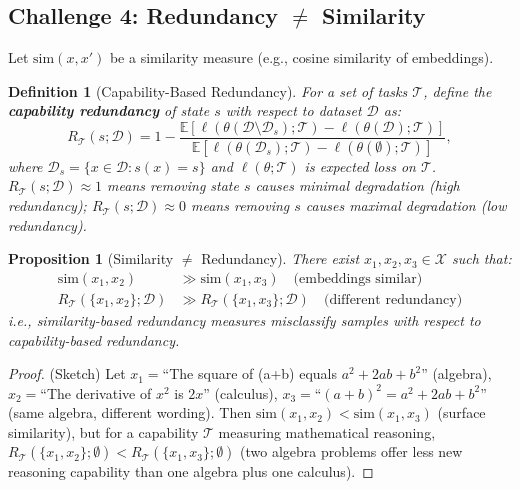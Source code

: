 \documentclass[11pt]{article}
\newtheorem{definition}{Definition}[section]
\newtheorem{proposition}{Proposition}[section]
\newcommand{\cX}{\mathcal{X}}
\newcommand{\cT}{\mathcal{T}}
\begin{document}
\subsection{Challenge 4: Redundancy $\neq$ Similarity}

Let $\text{sim}(x, x')$ be a similarity measure (e.g., cosine similarity of embeddings).

\begin{definition}[Capability-Based Redundancy]
For a set of tasks $\cT$, define the \textbf{capability redundancy} of state $s$ with respect to dataset $\mathcal{D}$ as:
\begin{equation}
R_{\cT}(s; \mathcal{D}) = 1 - \frac{\mathbb{E}[\ell(\theta(\mathcal{D} \setminus \mathcal{D}_s); \cT) - \ell(\theta(\mathcal{D}); \cT)]}{\mathbb{E}[\ell(\theta(\mathcal{D}_s); \cT) - \ell(\theta(\emptyset); \cT)]},
\label{eq:capability_redundancy_formal}
\end{equation}
where $\mathcal{D}_s = \{x \in \mathcal{D}: s(x) = s\}$ and $\ell(\theta; \cT)$ is expected loss on $\cT$. $R_{\cT}(s; \mathcal{D}) \approx 1$ means removing state $s$ causes minimal degradation (high redundancy); $R_{\cT}(s; \mathcal{D}) \approx 0$ means removing $s$ causes maximal degradation (low redundancy).
\end{definition}

\begin{proposition}[Similarity $\neq$ Redundancy]
There exist $x_1, x_2, x_3 \in \cX$ such that:
\begin{align}
\text{sim}(x_1, x_2) &\gg \text{sim}(x_1, x_3) \quad \text{(embeddings similar)} \\
R_{\cT}(\{x_1, x_2\}; \mathcal{D}) &\gg R_{\cT}(\{x_1, x_3\}; \mathcal{D}) \quad \text{(different redundancy)}
\label{eq:sim_neq_redundancy}
\end{align}
i.e., similarity-based redundancy measures misclassify samples with respect to capability-based redundancy.
\end{proposition}

\begin{proof}
(Sketch) Let $x_1 = $``The square of (a+b) equals $a^2 + 2ab + b^2$'' (algebra), $x_2 = $``The derivative of $x^2$ is $2x$'' (calculus), $x_3 = $``$(a+b)^2 = a^2 + 2ab + b^2$'' (same algebra, different wording). Then $\text{sim}(x_1, x_2) < \text{sim}(x_1, x_3)$ (surface similarity), but for a capability $\cT$ measuring mathematical reasoning, $R_{\cT}(\{x_1, x_2\}; \emptyset) < R_{\cT}(\{x_1, x_3\}; \emptyset)$ (two algebra problems offer less new reasoning capability than one algebra plus one calculus).
\end{proof}
\end{document}
